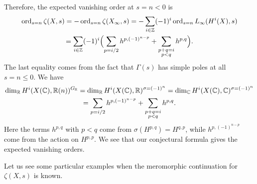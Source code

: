 \documentclass{article}
\numberwithin{equation}{section}
\begin{document}
\begin{remark}
  Therefore, the expected vanishing order at $s = n < 0$ is
  \begin{multline*}
    \operatorname{ord}_{s=n} \zeta (X,s) = -\operatorname{ord}_{s=n} \zeta (X_\infty,s)
    = -\sum_{i\in \mathbb{Z}} (-1)^i \operatorname{ord}_{s=n} L_\infty (H^i (X), s) \\
    = \sum_{i\in \mathbb{Z}} (-1)^i \Bigl(\sum_{p = i/2} h^{p,(-1)^{n-p}} +
    \sum_{\substack{p + q = i \\ p < q}} h^{p,q}\Bigr).
  \end{multline*}
  The last equality comes from the fact that $\Gamma (s)$ has simple poles at
  all $s = n \le 0$. We have
  \begin{multline*}
    \dim_{\mathbb{R}} H^i (X (\mathbb{C}), \mathbb{R} (n))^{G_{\mathbb{R}}} =
    \dim_{\mathbb{R}} H^i (X (\mathbb{C}), \mathbb{R})^{\sigma = (-1)^n} =
    \dim_{\mathbb{C}} H^i (X (\mathbb{C}), \mathbb{C})^{\sigma = (-1)^n} \\
    = \sum_{p = i/2} h^{p,(-1)^{n-p}} +
    \sum_{\substack{p + q = i \\ p < q}} h^{p,q}.
  \end{multline*}
  Here the terms $h^{p,q}$ with $p < q$ come from $\sigma (H^{p,q}) = H^{q,p}$,
  while $h^{p,(-1)^{n-p}}$ come from the action on $H^{p,p}$.
  We see that our conjectural formula gives the expected vanishing orders.
\end{remark}

Let us see some particular examples when the meromorphic continuation for
$\zeta (X,s)$ is known.
\end{document}
